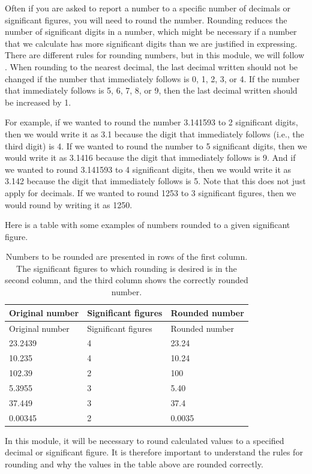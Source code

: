 \documentclass[
]{scrbook}
\begin{document}
Often if you are asked to report a number to a specific number of decimals or significant figures, you will need to round the number.
Rounding reduces the number of significant digits in a number, which might be necessary if a number that we calculate has more significant digits than we are justified in expressing.
There are different rules for rounding numbers, but in this module, we will follow \citet{Sokal1995}.
When rounding to the nearest decimal, the last decimal written should not be changed if the number that immediately follows is 0, 1, 2, 3, or 4.
If the number that immediately follows is 5, 6, 7, 8, or 9, then the last decimal written should be increased by 1.

For example, if we wanted to round the number 3.141593 to 2 significant digits, then we would write it as 3.1 because the digit that immediately follows (i.e., the third digit) is 4.
If we wanted to round the number to 5 significant digits, then we would write it as 3.1416 because the digit that immediately follows is 9.
And if we wanted to round 3.141593 to 4 significant digits, then we would write it as 3.142 because the digit that immediately follows is 5.
Note that this does not just apply for decimals.
If we wanted to round 1253 to 3 significant figures, then we would round by writing it as 1250.

Here is a table with some examples of numbers rounded to a given significant figure.

\begin{longtable}[]{@{}lll@{}}
\caption{Numbers to be rounded are presented in rows of the first column. The significant figures to which rounding is desired is in the second column, and the third column shows the correctly rounded number.}\tabularnewline
\toprule
Original number & Significant figures & Rounded number \\
\midrule
\endfirsthead
\toprule
Original number & Significant figures & Rounded number \\
\midrule
\endhead
23.2439 & 4 & 23.24 \\
10.235 & 4 & 10.24 \\
102.39 & 2 & 100 \\
5.3955 & 3 & 5.40 \\
37.449 & 3 & 37.4 \\
0.00345 & 2 & 0.0035 \\
\bottomrule
\end{longtable}

In this module, it will be necessary to round calculated values to a specified decimal or significant figure.
It is therefore important to understand the rules for rounding and why the values in the table above are rounded correctly.
\end{document}
